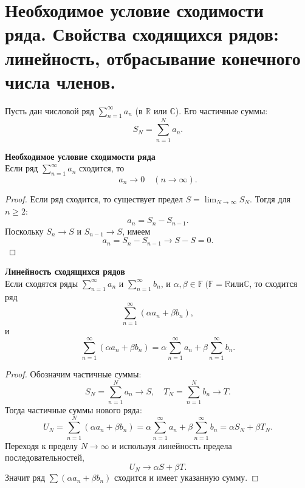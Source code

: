 \documentclass[14pt]{extreport}
\begin{document}
    \chapter{Необходимое условие сходимости ряда. Свойства сходящихся рядов: линейность, отбрасывание конечного числа членов.}

    Пусть дан числовой ряд $\sum_{n=1}^\infty a_n$ (в $\mathbb{R}$ или $\mathbb{C}$). Его частичные суммы:
    \[
    S_N = \sum_{n=1}^N a_n.
    \]

    \begin{theorem}
        \textbf{Необходимое условие сходимости ряда}\\
        Если ряд $\sum_{n=1}^\infty a_n$ сходится, то
        \[
        a_n \rightarrow 0 \quad (n \rightarrow \infty).
        \]
    \end{theorem}
    \begin{proof}
        Если ряд сходится, то существует предел $S = \lim_{N \rightarrow \infty} S_N$. Тогдя для $n \geq 2$:
        \[
        a_n = S_n - S_{n-1}.
        \]
        Поскольку $S_n \rightarrow S$ и $S_{n-1} \rightarrow S$, имеем
        \[
        a_n = S_n - S_{n-1} \rightarrow S - S = 0.
        \]
    \end{proof}

    \begin{theorem}
        \textbf{Линейность сходящихся рядов}\\
        Если сходятся ряды $\sum_{n=1}^\infty a_n$ и $\sum_{n=1}^\infty b_n$, и $\alpha, \beta \in \mathbb{F}\ (\mathbb{F} = \mathbb{R} \text{или} \mathbb{C}$, то сходится ряд
        \[
        \sum_{n=1}^\infty (\alpha a_n + \beta b_n),
        \]
        и
        \[
        \sum_{n=1}^\infty (\alpha a_n + \beta b_n) = \alpha\sum_{n=1}^\infty a_n + \beta\sum_{n=1}^\infty b_n.
        \]
    \end{theorem}
    \begin{proof}
        Обозначим частичные суммы:
        \[
        S_N = \sum_{n=1}^N a_n \rightarrow S, \quad T_N = \sum_{n=1}^N b_n \rightarrow T.
        \]
        Тогда частичные суммы нового ряда:
        \[
        U_N = \sum_{n=1}^N (\alpha a_n + \beta b_n) = \alpha\sum_{n=1}^\infty a_n + \beta\sum_{n=1}^\infty b_n = \alpha S_N + \beta T_N.
        \]
        Переходя к пределу $N \rightarrow \infty$ и используя линейность предела последовательностей,
        \[
        U_N \rightarrow \alpha S + \beta T.
        \]
        Значит ряд $\sum (\alpha a_n + \beta b_n)$ сходится и имеет указанную сумму.
    \end{proof}
\end{document}
